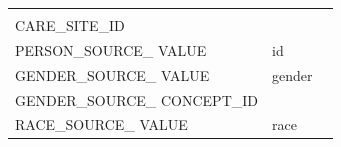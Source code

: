 \documentclass[11pt]{book}
\theoremstyle{definition}
\theoremstyle{definition}
\theoremstyle{definition}
\theoremstyle{remark}
\begin{document}
\begin{longtable}[]{@{}lll@{}}
\begin{minipage}[t]{0.13\columnwidth}
\strut
\end{minipage} & \begin{minipage}[t]{0.50\columnwidth}\raggedright\strut
\strut
\end{minipage}\tabularnewline
\begin{minipage}[t]{0.28\columnwidth}\raggedright\strut
CARE\_SITE\_ID\strut
\end{minipage} & \begin{minipage}[t]{0.13\columnwidth}\raggedright\strut
\strut
\end{minipage} & \begin{minipage}[t]{0.50\columnwidth}\raggedright\strut
\strut
\end{minipage}\tabularnewline
\begin{minipage}[t]{0.28\columnwidth}\raggedright\strut
PERSON\_SOURCE\_ VALUE\strut
\end{minipage} & \begin{minipage}[t]{0.13\columnwidth}\raggedright\strut
id\strut
\end{minipage} & \begin{minipage}[t]{0.50\columnwidth}\raggedright\strut
\strut
\end{minipage}\tabularnewline
\begin{minipage}[t]{0.28\columnwidth}\raggedright\strut
GENDER\_SOURCE\_ VALUE\strut
\end{minipage} & \begin{minipage}[t]{0.13\columnwidth}\raggedright\strut
gender\strut
\end{minipage} & \begin{minipage}[t]{0.50\columnwidth}\raggedright\strut
\strut
\end{minipage}\tabularnewline
\begin{minipage}[t]{0.28\columnwidth}\raggedright\strut
GENDER\_SOURCE\_ CONCEPT\_ID\strut
\end{minipage} & \begin{minipage}[t]{0.13\columnwidth}\raggedright\strut
\strut
\end{minipage} & \begin{minipage}[t]{0.50\columnwidth}\raggedright\strut
\strut
\end{minipage}\tabularnewline
\begin{minipage}[t]{0.28\columnwidth}\raggedright\strut
RACE\_SOURCE\_ VALUE\strut
\end{minipage} & \begin{minipage}[t]{0.13\columnwidth}\raggedright\strut
race\strut
\end{minipage} & \begin{minipage}[t]{0.50\columnwidth}\raggedright\strut

\end{minipage}
\end{longtable}
\end{document}
